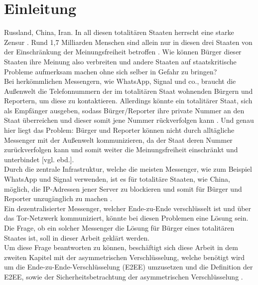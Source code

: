\documentclass[a4paper,ngerman, headheight=28pt,12pt]{scrartcl}
\newcommand{\vcite}[1]{\cite[vgl.][]{#1}}
\newcommand{\vebd}{[vgl. ebd.]}
\begin{document}

\tableofcontents
\setcounter{page}{0}
\thispagestyle{empty}
\vspace{0.5cm}
\pagebreak


\linenumbers{}
\modulolinenumbers[5]
\section{Einleitung}
Russland, China, Iran. In all diesen totalitären Staaten herrscht eine starke Zensur \vcite{AmnReport}. Rund 1,7 Milliarden Menschen sind allein nur in diesen drei Staaten von der Einschränkung der Meinungsfreiheit betroffen \vcite{UnPop}. Wie können Bürger
dieser Staaten ihre Meinung also verbreiten und andere Staaten auf
staatskritische Probleme aufmerksam machen ohne sich selber in Gefahr zu bringen?
\\
Bei herkömmlichen Messengern, wie WhatsApp, Signal und co., braucht die Außenwelt die Telefonnummern der im totalitären Staat wohnenden Bürgern und Reportern, um diese zu kontaktieren. Allerdings könnte ein totalitärer Staat, sich als Empfänger ausgeben, sodass Bürger/Reporter ihre private Nummer an den Staat überreichen und dieser somit jene Nummer rückverfolgen kann \vcite{LocPolice}.
Und genau hier liegt das Problem: Bürger und Reporter können nicht durch alltägliche Messenger mit der Außenwelt kommunizieren, da der Staat deren Nummer zurückverfolgen kann und somit weiter die Meinungsfreiheit einschränkt und unterbindet \vebd.
\\
Durch die zentrale Infrastruktur, welche die meisten Messenger, wie zum Beispiel WhatsApp und Signal verwenden, ist es für totalitäre Staaten, wie China, möglich, die IP-Adressen jener Server zu blockieren und somit für Bürger und Reporter unzugänglich zu machen \vcite{ChinaFirewall,CentralizedWhatsapp}.
\\
Ein dezentralisierter Messenger, welcher Ende-zu-Ende verschlüsselt ist und über das Tor-Netzwerk kommuniziert, könnte bei diesen Problemen eine Lösung sein. Die Frage, ob ein solcher Messenger die Lösung für Bürger eines totalitären Staates ist, soll in dieser Arbeit geklärt werden.
\\
Um diese Frage beantworten zu können, beschäftigt sich diese Arbeit in dem zweiten Kapitel mit der asymmetrischen Verschlüsselung, welche benötigt wird um die Ende-zu-Ende-Verschlüsselung (E2EE) umzusetzen und die Definition der E2EE, sowie der Sicherheitsbetrachtung der asymmetrischen Verschlüsselung \vcite{E2EE-Method}.
\end{document}
